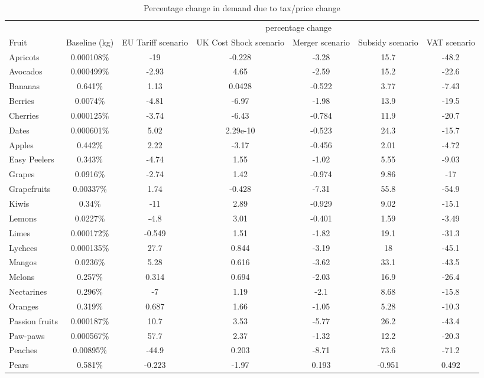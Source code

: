 \documentclass[11pt]{article}
\begin{document}
\begin{table}[h]
\caption{Percentage change in demand due to tax/price change}
\label{table:tax impact 1}
\begin{center}
\begin{tabular}{lcccccc} \hline \hline
& & \multicolumn{5}{c}{percentage change} \\
Fruit & Baseline (kg) &EU Tariff scenario &UK Cost Shock scenario &Merger scenario &Subsidy scenario &VAT scenario \\ \hline
Apricots &0.000108\% &-19 &-0.228 &-3.28 &15.7 &-48.2 \\
Avocados &0.000499\% &-2.93 &4.65 &-2.59 &15.2 &-22.6 \\
Bananas &0.641\% &1.13 &0.0428 &-0.522 &3.77 &-7.43 \\
Berries &0.0074\% &-4.81 &-6.97 &-1.98 &13.9 &-19.5 \\
Cherries &0.000125\% &-3.74 &-6.43 &-0.784 &11.9 &-20.7 \\
\hline
Dates &0.000601\% &5.02 &2.29e-10 &-0.523 &24.3 &-15.7 \\
Apples &0.442\% &2.22 &-3.17 &-0.456 &2.01 &-4.72 \\
Easy Peelers &0.343\% &-4.74 &1.55 &-1.02 &5.55 &-9.03 \\
Grapes &0.0916\% &-2.74 &1.42 &-0.974 &9.86 &-17 \\
Grapefruits &0.00337\% &1.74 &-0.428 &-7.31 &55.8 &-54.9 \\
\hline
Kiwis &0.34\% &-11 &2.89 &-0.929 &9.02 &-15.1 \\
Lemons &0.0227\% &-4.8 &3.01 &-0.401 &1.59 &-3.49 \\
Limes &0.000172\% &-0.549 &1.51 &-1.82 &19.1 &-31.3 \\
Lychees &0.000135\% &27.7 &0.844 &-3.19 &18 &-45.1 \\
Mangos &0.0236\% &5.28 &0.616 &-3.62 &33.1 &-43.5 \\
\hline
Melons &0.257\% &0.314 &0.694 &-2.03 &16.9 &-26.4 \\
Nectarines &0.296\% &-7 &1.19 &-2.1 &8.68 &-15.8 \\
Oranges &0.319\% &0.687 &1.66 &-1.05 &5.28 &-10.3 \\
Passion fruits &0.000187\% &10.7 &3.53 &-5.77 &26.2 &-43.4 \\
Paw-paws &0.000567\% &57.7 &2.37 &-1.32 &12.2 &-20.3 \\
\hline
Peaches &0.00895\% &-44.9 &0.203 &-8.71 &73.6 &-71.2 \\
Pears &0.581\% &-0.223 &-1.97 &0.193 &-0.951 &0.492 \\

\end{tabular}
\end{center}
\end{table}
\end{document}
